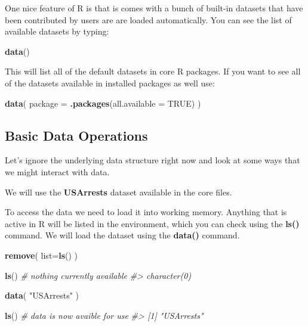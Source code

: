 \documentclass[]{book}
\newenvironment{Shaded}{\begin{snugshade}}{\end{snugshade}}
\newcommand{\CommentTok}[1]{\textcolor[rgb]{0.56,0.35,0.01}{\textit{#1}}}
\newcommand{\DataTypeTok}[1]{\textcolor[rgb]{0.13,0.29,0.53}{#1}}
\newcommand{\KeywordTok}[1]{\textcolor[rgb]{0.13,0.29,0.53}{\textbf{#1}}}
\newcommand{\NormalTok}[1]{#1}
\newcommand{\OtherTok}[1]{\textcolor[rgb]{0.56,0.35,0.01}{#1}}
\newcommand{\StringTok}[1]{\textcolor[rgb]{0.31,0.60,0.02}{#1}}
\theoremstyle{definition}
\theoremstyle{definition}
\theoremstyle{definition}
\theoremstyle{remark}
\begin{document}
One nice feature of R is that is comes with a bunch of built-in datasets
that have been contributed by users are are loaded automatically. You
can see the list of available datasets by typing:

\begin{Shaded}
\begin{Highlighting}[]
\KeywordTok{data}\NormalTok{()}
\end{Highlighting}
\end{Shaded}

This will list all of the default datasets in core R packages. If you
want to see all of the datasets available in installed packages as well
use:

\begin{Shaded}
\begin{Highlighting}[]
\KeywordTok{data}\NormalTok{( }\DataTypeTok{package =} \KeywordTok{.packages}\NormalTok{(}\DataTypeTok{all.available =} \OtherTok{TRUE}\NormalTok{) )}
\end{Highlighting}
\end{Shaded}

\hypertarget{basic-data-operations}{%
\subsection{Basic Data Operations}\label{basic-data-operations}}

Let's ignore the underlying data structure right now and look at some
ways that we might interact with data.

We will use the \textbf{USArrests} dataset available in the core files.

To access the data we need to load it into working memory. Anything that
is active in R will be listed in the environment, which you can check
using the \textbf{ls()} command. We will load the dataset using the
\textbf{data()} command.

\begin{Shaded}
\begin{Highlighting}[]
\KeywordTok{remove}\NormalTok{( }\DataTypeTok{list=}\KeywordTok{ls}\NormalTok{() )}
\end{Highlighting}
\end{Shaded}

\begin{Shaded}
\begin{Highlighting}[]

\KeywordTok{ls}\NormalTok{() }\CommentTok{# nothing currently available}
\CommentTok{#> character(0)}

\KeywordTok{data}\NormalTok{( }\StringTok{"USArrests"}\NormalTok{ )}

\KeywordTok{ls}\NormalTok{() }\CommentTok{# data is now avaible for use}
\CommentTok{#> [1] "USArrests"}
\end{Highlighting}
\end{Shaded}
\end{document}
